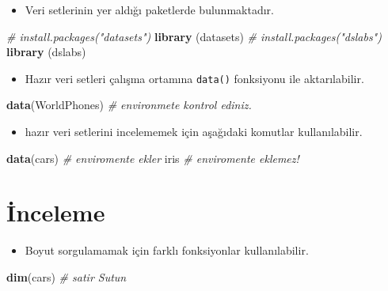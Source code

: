 \documentclass[
  oneside]{book}
\newenvironment{Shaded}{\begin{snugshade}}{\end{snugshade}}
\newcommand{\CommentTok}[1]{\textcolor[rgb]{0.56,0.35,0.01}{\textit{#1}}}
\newcommand{\FunctionTok}[1]{\textcolor[rgb]{0.13,0.29,0.53}{\textbf{#1}}}
\newcommand{\NormalTok}[1]{#1}
\providecommand{\tightlist}{%
  \setlength{\itemsep}{0pt}\setlength{\parskip}{0pt}}
\begin{document}
\begin{itemize}
\tightlist
\item
  Veri setlerinin yer aldığı paketlerde bulunmaktadır.
\end{itemize}

\begin{Shaded}
\begin{Highlighting}[]
\CommentTok{\# install.packages("datasets")}
\FunctionTok{library}\NormalTok{ (datasets)}
\CommentTok{\# install.packages("dslabs")}
\FunctionTok{library}\NormalTok{ (dslabs)}
\end{Highlighting}
\end{Shaded}

\begin{itemize}
\tightlist
\item
  Hazır veri setleri çalışma ortamına \texttt{data()} fonksiyonu ile aktarılabilir.
\end{itemize}

\begin{Shaded}
\begin{Highlighting}[]
\FunctionTok{data}\NormalTok{(WorldPhones) }\CommentTok{\# environmete kontrol ediniz. }
\end{Highlighting}
\end{Shaded}

\begin{itemize}
\tightlist
\item
  hazır veri setlerini incelememek için aşağıdaki komutlar kullanılabilir.
\end{itemize}

\begin{Shaded}
\begin{Highlighting}[]
\FunctionTok{data}\NormalTok{(cars) }\CommentTok{\# enviromente ekler}
\NormalTok{iris      }\CommentTok{\# enviromente eklemez!}
\end{Highlighting}
\end{Shaded}

\hypertarget{inceleme}{%
\section{İnceleme}\label{inceleme}}

\begin{itemize}
\tightlist
\item
  Boyut sorgulamamak için farklı fonksiyonlar kullanılabilir.
\end{itemize}

\begin{Shaded}
\begin{Highlighting}[]
\FunctionTok{dim}\NormalTok{(cars) }\CommentTok{\# satir Sutun}
\end{Highlighting}
\end{Shaded}
\end{document}
